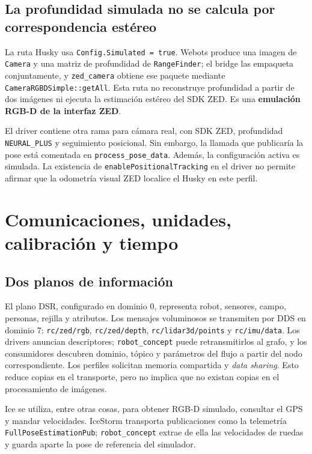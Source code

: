 \documentclass[11pt,a4paper]{article}
\newcommand{\code}[1]{\nolinkurl{#1}}
\begin{document}
\subsection{La profundidad simulada no se calcula por correspondencia estéreo}
\label{sec:simdepth}
La ruta Husky usa \code{Config.Simulated = true}. Webots produce una imagen de
\code{Camera} y una matriz de profundidad de \code{RangeFinder}; el bridge las
empaqueta conjuntamente, y \code{zed_camera} obtiene ese paquete mediante
\code{CameraRGBDSimple::getAll}. Esta ruta no reconstruye profundidad a partir de
dos imágenes ni ejecuta la estimación estéreo del SDK ZED. Es una \textbf{emulación
RGB-D de la interfaz ZED}.~\cite{bridgecamera,zeddriver,zedconfig}

El driver contiene otra rama para cámara real, con SDK ZED, profundidad
\code{NEURAL_PLUS} y seguimiento posicional. Sin embargo, la llamada que publicaría
la pose está comentada en \code{process_pose_data}. Además, la configuración activa es
simulada. La existencia de \code{enablePositionalTracking} en el driver no permite
afirmar que la odometría visual ZED localice el Husky en este perfil.~\cite{zeddriver}

\section{Comunicaciones, unidades, calibración y tiempo}

\subsection{Dos planos de información}
El plano DSR, configurado en dominio 0, representa robot, sensores, campo, personas,
rejilla y atributos. Los mensajes voluminosos se transmiten por DDS en dominio 7:
\code{rc/zed/rgb}, \code{rc/zed/depth}, \code{rc/lidar3d/points} y
\code{rc/imu/data}. Los drivers anuncian descriptores; \code{robot_concept} puede
retransmitirlos al grafo, y los consumidores descubren dominio, tópico y parámetros
del flujo a partir del nodo correspondiente. Los perfiles solicitan memoria
compartida y \emph{data sharing}. Esto reduce copias en el transporte, pero no implica
que no existan copias en el procesamiento de imágenes.~\cite{robotconfig,media,lidarconfig,zedconfig}

Ice se utiliza, entre otras cosas, para obtener RGB-D simulado, consultar el GPS y
mandar velocidades. IceStorm transporta publicaciones como la telemetría
\code{FullPoseEstimationPub}; \code{robot_concept} extrae de ella las velocidades de
ruedas y guarda aparte la pose de referencia del simulador.~\cite{bridgeconfig,robotworker,launchsub}
\end{document}
